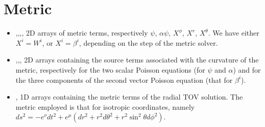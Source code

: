 \documentclass[letterpaper,10pt,english]{sphinxmanual}
\begin{document}
\section{Metric}
\label{\detokenize{arrays:metric}}\begin{itemize}
\item {} 
\sphinxAtStartPar
{},,,, \sphinxhyphen{} 2D arrays of metric terms, respectively \(\psi\), \(\alpha \psi\), \(X^{\phi}\), \(X^{r}\), \(X^{\theta}\). We have either \(X^i=W^i\), or \(X^i = \beta ^i\), depending on the step of the metric solver.


\item {} 
\sphinxAtStartPar
{},,, \sphinxhyphen{} 2D arrays containing the source terms associated with the curvature
of the metric, respectively for the two scalar Poisson equations (for \(\psi\) and \(\alpha\)) and for the three
components of the second vector Poisson equation (that for \(\beta ^i\)).


\item {} 
\sphinxAtStartPar
{}, \sphinxhyphen{} 1D arrays containing the metric terms of the radial TOV solution. The metric employed is
that for isotropic coordinates, namely \(ds^2 = -e^\nu dt^2 + e^\mu (dr^2 + r^2 d\theta ^2 + r^2 \sin ^2 \theta d\phi ^2)\).

\end{itemize}
\end{document}

